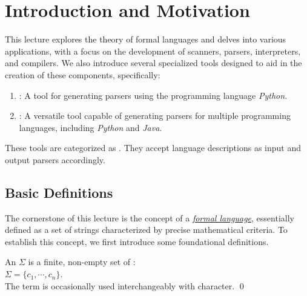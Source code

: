 \chapter{Introduction and Motivation}
This lecture explores the theory of formal languages and delves into various applications, with a focus on the
development of scanners, parsers, interpreters, and compilers. We also introduce several specialized tools
designed to aid in the creation of these components, specifically: 
\begin{enumerate}
\item {}:  A tool for generating parsers using the programming language
      \textsl{Python}. 
\item {}:  A versatile tool capable of generating parsers for multiple
       programming languages, including \textsl{Python} and \textsl{Java}. 
\end{enumerate}
These tools are categorized as . They accept language descriptions as input and output
parsers accordingly. 

\section{Basic Definitions}
The cornerstone of this lecture is the concept of a \href{http://en.wikipedia.org/wiki/Formal_language}{\emph{formal language}},  essentially defined as a set of strings characterized by precise mathematical criteria. To establish this concept, we first introduce some foundational definitions.

\begin{Definition}[Alphabet]
An  \( \Sigma \)  is a finite, non-empty set of :
\\[0.2cm]
\hspace*{1.3cm}
\( \Sigma = \{ c_1, \cdots, c_n \} \).
\\[0.2cm]
The term   is occasionally used interchangeably with character.
\qed
\end{Definition}

